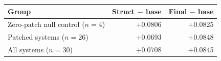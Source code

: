\begin{tabular}{lrr}
\toprule
Group & Struct $-$ base & Final $-$ base \\
\midrule
Zero-patch null control ($n{=}4$) & +0.0806 & +0.0825 \\
Patched systems ($n{=}26$) & +0.0693 & +0.0848 \\
All systems ($n{=}30$) & +0.0708 & +0.0845 \\
\bottomrule
\end{tabular}
